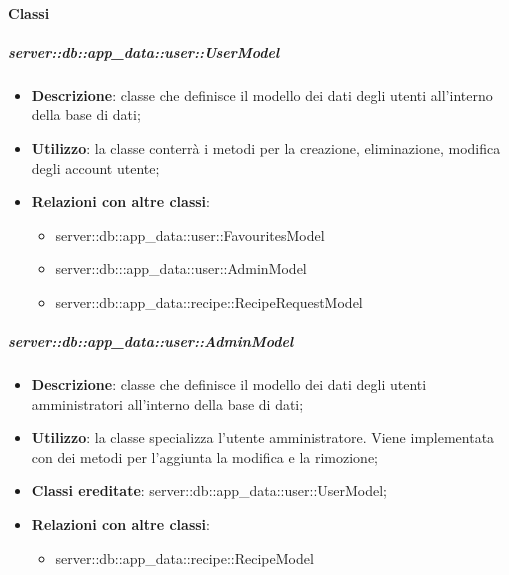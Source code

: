 	\paragraph{Classi} %

		\subparagraph{server::db::app\_data::user::UserModel} %
		\label{subp:server_db_app_data_user_user_model}
			\begin{itemize}
				\item \textbf{Descrizione}: classe che definisce il modello dei dati degli utenti all'interno della base di dati;
				\item \textbf{Utilizzo}: la classe conterrà i metodi per la creazione, eliminazione, modifica degli account utente;
				\item \textbf{Relazioni con altre classi}:
					\begin{itemize}
						\item server::db::app\_data::user::FavouritesModel
						\item server::db:::app\_data::user::AdminModel
						\item server::db::app\_data::recipe::RecipeRequestModel
					\end{itemize}
			\end{itemize}


		\subparagraph{server::db::app\_data::user::AdminModel} %
		\label{subp:server_db_app_data_user_admin_model}
			\begin{itemize}
				\item \textbf{Descrizione}: classe che definisce il modello dei dati degli utenti amministratori all'interno della base di dati;
				\item \textbf{Utilizzo}: la classe specializza l'utente amministratore. Viene implementata con dei metodi per l'aggiunta la modifica e la rimozione;
				\item \textbf{Classi ereditate}: server::db::app\_data::user::UserModel;
				\item \textbf{Relazioni con altre classi}:
					\begin{itemize}
						\item server::db::app\_data::recipe::RecipeModel
					\end{itemize}
			\end{itemize}


